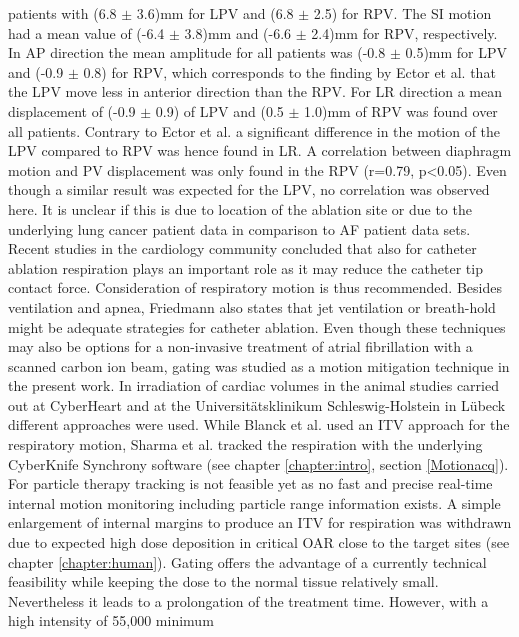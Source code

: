 patients with (6.8 $\pm$ 3.6)mm for LPV and (6.8 $\pm$ 2.5) for RPV. The SI motion had a mean value of (-6.4 $\pm$ 3.8)mm and 
(-6.6 $\pm$ 2.4)mm for RPV, respectively. In AP direction the mean amplitude for all patients was (-0.8 $\pm$ 0.5)mm for LPV and 
(-0.9 $\pm$ 0.8) for RPV, which corresponds to the finding by Ector et al. that the LPV move less in anterior direction than the RPV. For LR 
direction a mean displacement of (-0.9 $\pm$ 0.9) of LPV and (0.5 $\pm$ 1.0)mm of RPV was found over all patients. 
Contrary to Ector et al. a significant difference in the motion of the LPV compared to RPV was hence found in LR. 
A correlation between diaphragm motion and PV displacement was only found in the RPV (r=0.79, p<0.05). Even though a similar result was 
expected for the LPV, no correlation was observed here. It is unclear if this is due to location of the ablation site or due to the 
underlying lung cancer patient data in comparison to AF patient data sets.\newline
\newline
Recent studies in the cardiology community \cite{Kum12} concluded that also for catheter ablation respiration plays an important role as it may 
reduce the catheter tip contact force. Consideration of respiratory motion is thus recommended. Besides ventilation and apnea, Friedmann 
\cite{Frie12} also states that jet ventilation or breath-hold might be adequate strategies for catheter ablation. Even though these techniques 
may also be options for a non-invasive treatment of atrial fibrillation with a scanned carbon ion beam, gating was 
studied as a motion mitigation technique in the present work. In irradiation of cardiac volumes in the animal studies carried out 
at CyberHeart and at the Universit\"atsklinikum Schleswig-Holstein in L\"ubeck different approaches were used. While Blanck et al. 
\cite{Bla13} used an ITV approach for the respiratory motion, Sharma et al. \cite{Sha10} tracked the respiration with the underlying 
CyberKnife Synchrony software (see chapter \ref{chapter:intro}, section \ref{Motionacq}). For particle therapy tracking is not feasible yet as 
no fast and precise real-time internal motion monitoring including particle range information exists. A simple enlargement of internal margins 
to produce an ITV for respiration was withdrawn due to expected high dose deposition in critical OAR close to the target sites 
(see chapter \ref{chapter:human}). Gating offers the advantage of a currently technical feasibility while keeping the dose to the normal 
tissue relatively small. Nevertheless it leads to a prolongation of the treatment time. However, with a high intensity of 55,000 minimum 
